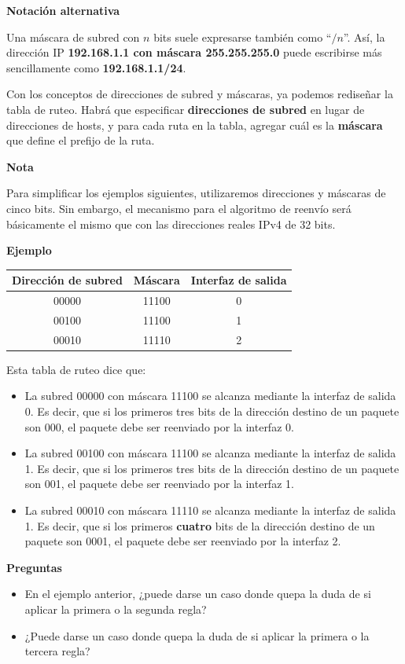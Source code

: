\documentclass[spanish,a4paper,]{article}
\providecommand{\tightlist}{%
  \setlength{\itemsep}{0pt}\setlength{\parskip}{0pt}}
\begin{document}
\textbf{Notación alternativa}

Una máscara de subred con \(n\) bits suele expresarse también como
``\(/n\)''. Así, la dirección IP \textbf{192.168.1.1 con máscara
255.255.255.0} puede escribirse más sencillamente como
\textbf{192.168.1.1/24}.

Con los conceptos de direcciones de subred y máscaras, ya podemos
rediseñar la tabla de ruteo. Habrá que especificar \textbf{direcciones
de subred} en lugar de direcciones de hosts, y para cada ruta en la
tabla, agregar cuál es la \textbf{máscara} que define el prefijo de la
ruta.

\textbf{Nota}

Para simplificar los ejemplos siguientes, utilizaremos direcciones y
máscaras de cinco bits. Sin embargo, el mecanismo para el algoritmo de
reenvío será básicamente el mismo que con las direcciones reales IPv4 de
32 bits.

\textbf{Ejemplo}

\begin{longtable}[]{@{}ccc@{}}
\toprule
Dirección de subred & Máscara & Interfaz de salida\tabularnewline
\midrule
\endhead
00000 & 11100 & 0\tabularnewline
00100 & 11100 & 1\tabularnewline
00010 & 11110 & 2\tabularnewline
\bottomrule
\end{longtable}

Esta tabla de ruteo dice que:

\begin{itemize}
\tightlist
\item
  La subred 00000 con máscara 11100 se alcanza mediante la interfaz de
  salida 0. Es decir, que si los primeros tres bits de la dirección
  destino de un paquete son 000, el paquete debe ser reenviado por la
  interfaz 0.
\item
  La subred 00100 con máscara 11100 se alcanza mediante la interfaz de
  salida 1. Es decir, que si los primeros tres bits de la dirección
  destino de un paquete son 001, el paquete debe ser reenviado por la
  interfaz 1.
\item
  La subred 00010 con máscara 11110 se alcanza mediante la interfaz de
  salida 1. Es decir, que si los primeros \textbf{cuatro} bits de la
  dirección destino de un paquete son 0001, el paquete debe ser
  reenviado por la interfaz 2.
\end{itemize}

\textbf{Preguntas}

\begin{itemize}
\tightlist
\item
  En el ejemplo anterior, ¿puede darse un caso donde quepa la duda de si
  aplicar la primera o la segunda regla?
\item
  ¿Puede darse un caso donde quepa la duda de si aplicar la primera o la
  tercera regla?
\end{itemize}
\end{document}
